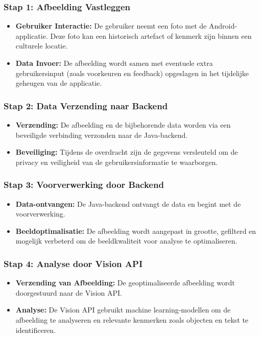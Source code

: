 \subsubsection{Stap 1: Afbeelding Vastleggen}
\begin{itemize}
    \item \textbf{Gebruiker Interactie:} De gebruiker neemt een foto met de Android-applicatie. Deze foto kan een historisch artefact of kenmerk zijn binnen een culturele locatie.
    \item \textbf{Data Invoer:} De afbeelding wordt samen met eventuele extra gebruikersinput (zoals voorkeuren en feedback) opgeslagen in het tijdelijke geheugen van de applicatie.
\end{itemize}

\subsubsection{Stap 2: Data Verzending naar Backend}
\begin{itemize}
    \item \textbf{Verzending:} De afbeelding en de bijbehorende data worden via een beveiligde verbinding verzonden naar de Java-backend.
    \item \textbf{Beveiliging:} Tijdens de overdracht zijn de gegevens versleuteld om de privacy en veiligheid van de gebruikersinformatie te waarborgen.
\end{itemize}

\subsubsection{Stap 3: Voorverwerking door Backend}
\begin{itemize}
    \item \textbf{Data-ontvangen:} De Java-backend ontvangt de data en begint met de voorverwerking.
    \item \textbf{Beeldoptimalisatie:} De afbeelding wordt aangepast in grootte, gefilterd en mogelijk verbeterd om de beeldkwaliteit voor analyse te optimaliseren.
\end{itemize}

\subsubsection{Stap 4: Analyse door Vision API}
\begin{itemize}
    \item \textbf{Verzending van Afbeelding:} De geoptimaliseerde afbeelding wordt doorgestuurd naar de Vision API.
    \item \textbf{Analyse:} De Vision API gebruikt machine learning-modellen om de afbeelding te analyseren en relevante kenmerken zoals objecten en tekst te identificeren.
\end{itemize}

